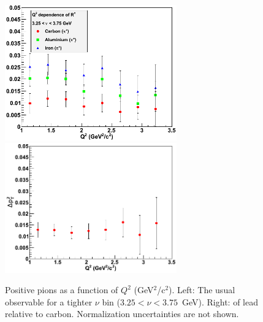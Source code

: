 \begin{figure}[tbp]
\centering
\includegraphics[width=7.4cm] {chap6-fig/F_PvQ2inNu.png} 
\includegraphics[width=7.4cm] {chap6-fig/F_PvQ2_PbC.png} 
\caption {Positive pions \dpt as a function of $Q^2$ (GeV$^2$/c$^2$). Left: The usual observable for a tighter $\nu$ bin ($3.25 < \nu < 3.75$~GeV). Right: \dpt 
of lead relative to carbon. Normalization uncertainties are not shown.}
\label{fig:PQ2-detailed}
\end{figure}

